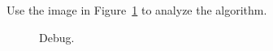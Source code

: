 \documentclass[paper=a4, fontsize=11pt]{scrartcl} %
\numberwithin{equation}{section} %
\numberwithin{figure}{section} %
\numberwithin{table}{section} %
\begin{document}
Use the image in Figure~\ref{fig:debug} to analyze the algorithm.

\begin{figure}[h]
	\centering
	\caption{Debug.}
	\label{fig:debug}
\end{figure}
\end{document}
